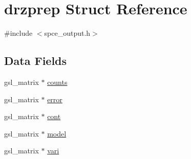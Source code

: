\hypertarget{structdrzprep}{
\section{drzprep Struct Reference}
\label{structdrzprep}
}


{\ttfamily \#include $<$spce\_\-output.h$>$}\subsection*{Data Fields}
\begin{DoxyCompactItemize}
\item 
gsl\_\-matrix $\ast$ \hyperlink{structdrzprep_a215f7390764932e09f5589bf97c52aec}{counts}
\item 
gsl\_\-matrix $\ast$ \hyperlink{structdrzprep_a105921a3d8442eacc2a7f6f98e8d06f9}{error}
\item 
gsl\_\-matrix $\ast$ \hyperlink{structdrzprep_a65b1b1ebedbc949e2536415ac83b5427}{cont}
\item 
gsl\_\-matrix $\ast$ \hyperlink{structdrzprep_ad0fd183b34cc7ee92112db1a31185fb6}{model}
\item 
gsl\_\-matrix $\ast$ \hyperlink{structdrzprep_a0039f4cd84c8b2f6c0ea10cac1bc1b37}{vari}
\end{DoxyCompactItemize}


